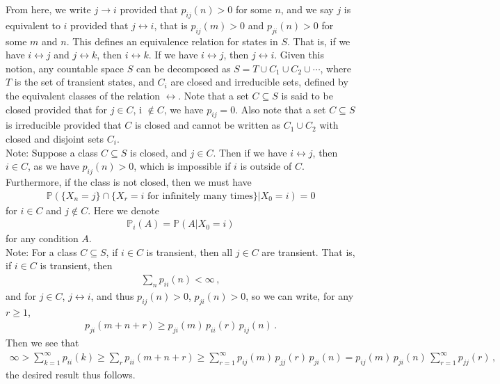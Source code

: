\documentclass[11pt, onesided]{book}
\theoremstyle{break}
\theoremstyle{break}
\newcommand{\note}{\color{red}Note: \color{black}}
\begin{document}
From here, we write $j \to i$ provided that $p_{ij}(n) >0$ for some $n$, and we say $j$ is equivalent to $i$ provided that $j\leftrightarrow i$, that is $p_{ij}(m) >0$ and $p_{ji}(n) >0$ for some $m$ and $n$. This defines an equivalence relation for states in $S$. That is, if we have $i \leftrightarrow j$ and $j\leftrightarrow k$, then $i \leftrightarrow k$. If we have $i \leftrightarrow j$, then $j \leftrightarrow i$. Given this notion, any countable space $S$ can be decomposed as $S = T \cup C_1 \cup C_2 \cup \cdots$, where $T$ is the set of transient states, and $C_i$ are closed and irreducible sets, defined by the equivalent classes of the relation $\leftrightarrow$. Note that a set $C \subseteq S$ is said to be closed provided that for $j \in C$, i $\notin C$, we have $p_{ij} = 0$. Also note that a set $C \subseteq S$ is irreducible provided that $C$ is closed and cannot be written as $C_1 \cup C_2$ with closed and disjoint sets $C_i$. 
\\

\note Suppose a class $C \subseteq S$ is closed, and $j \in C$. Then if we have $ i\leftrightarrow j$, then $i \in C$, as we have $p_{ij}(n) > 0$, which is impossible if $i$ is outside of $C$. Furthermore, if the class is not closed, then we must have
\begin{align*}
\mathbb{P}\left(\{X_n = j\} \cap \{X_r = i\text{ for infinitely many times}\} |X_0 = i\right) = 0
\end{align*}
for $i \in C$ and $j \notin C$. Here we denote
\begin{align*}
\mathbb{P}_i(A) = \mathbb{P}(A |X_0=i) 
\end{align*}
for any condition $A$.\\

\note For a class $C \subseteq S$, if $i \in C$ is transient, then all $j \in C$ are transient. That is, if $i \in C$ is transient, then
\begin{align*}
\sum_n p_{ii}(n) < \infty\,,
\end{align*}
and for $j \in C$, $j \leftrightarrow i$, and thus $p_{ij}(n) > 0$, $p_{ji}(n) > 0$, so we can write, for any $r \geq 1$, 
\begin{align*}
p_{ji}(m+n+r) \geq p_{ji}(m)\, p_{ii}(r) \, p_{ij}(n)\,.
\end{align*}
Then we see that
\begin{align*}
\infty> \sum_{k=1}^\infty p_{ii}(k) \geq \sum_r p_{ii}(m+n+r) \geq \sum_{r=1}^\infty p_{ij}(m)\, p_{jj}(r) \, p_{ji}(n) = p_{ij}(m)\, p_{ji}(n) \, \sum_{r=1}^\infty p_{jj}(r)\,,
\end{align*}
the desired result thus follows. 
\end{document}
